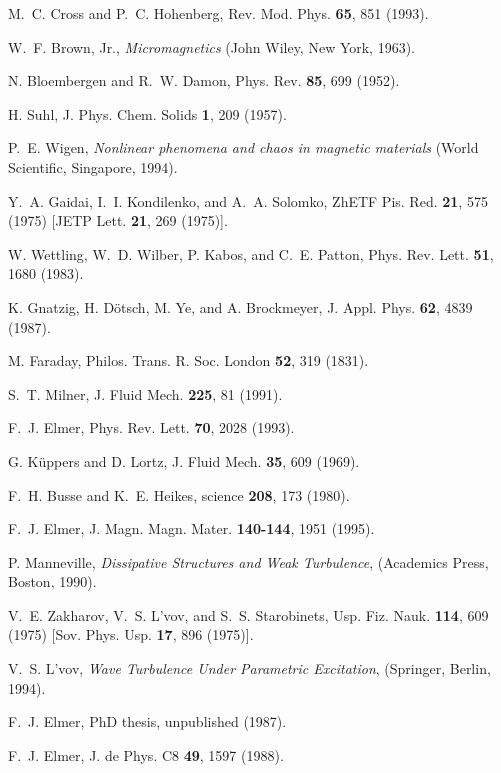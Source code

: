 \begin{references}

M.~C. Cross and P.~C. Hohenberg, Rev. Mod. Phys. {\bf 65}, 851 
(1993).

W.~F. Brown, Jr., {\it Micromagnetics} (John Wiley, New York, 1963).

N. Bloembergen and R.~W. Damon, Phys. Rev. {\bf 85}, 699 (1952).

H. Suhl, J. Phys. Chem. Solids {\bf 1}, 209 (1957).

P.~E. Wigen, {\it Nonlinear phenomena and chaos in magnetic
materials} (World Scientific, Singapore, 1994).

Y.~A. Gaidai, I.~I. Kondilenko, and A.~A. Solomko, ZhETF Pis. Red. 
{\bf 21}, 575 (1975) [JETP Lett. {\bf 21}, 269 (1975)].

W. Wettling, W.~D. Wilber, P. Kabos, and C.~E. Patton, Phys. Rev.
Lett. {\bf 51}, 1680 (1983).

K. Gnatzig, H. D\"otsch, M. Ye, and A. Brockmeyer, J. Appl. Phys. 
{\bf 62}, 4839 (1987).

M. Faraday, Philos. Trans. R. Soc. London {\bf 52}, 319 (1831).

S.~T. Milner, J. Fluid Mech. {\bf 225}, 81 (1991).

F.~J. Elmer, Phys. Rev. Lett. {\bf 70}, 2028 (1993).

G. K\"uppers and D. Lortz, J. Fluid Mech. {\bf 35}, 609 (1969).

F.~H. Busse and K.~E. Heikes, science {\bf 208}, 173 (1980).

F.~J. Elmer, J. Magn. Magn. Mater. {\bf 140-144}, 1951 (1995).

P. Manneville, {\it Dissipative Structures and Weak Turbulence}, 
(Academics Press, Boston, 1990).

V.~E. Zakharov, V.~S. L'vov, and S.~S. Starobinets, Usp. Fiz. Nauk. 
{\bf 114}, 609 (1975) [Sov. Phys. Usp. {\bf 17}, 896 (1975)].

V.~S. L'vov, {\it Wave Turbulence Under Parametric Excitation},
(Springer, Berlin, 1994).

F.~J. Elmer, PhD thesis, unpublished (1987).

F.~J. Elmer, J. de Phys. C8 {\bf 49}, 1597 (1988).


\end{references}
